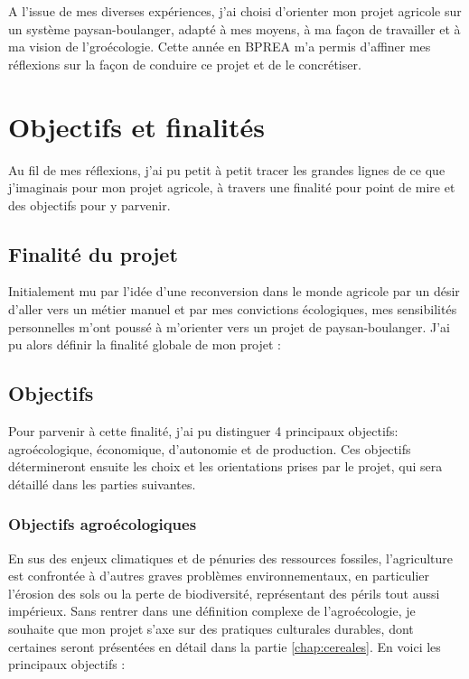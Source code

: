 \documentclass{book}
\begin{document}
A l'issue de mes diverses expériences, j'ai choisi d'orienter mon projet agricole sur un système paysan-boulanger, adapté à mes moyens, à ma façon de travailler et à ma vision de l'groécologie. Cette année en BPREA m'a permis d'affiner mes réflexions sur la façon de conduire ce projet et de le concrétiser. 

\section{Objectifs et finalités}

Au fil de mes réflexions, j'ai pu petit à petit tracer les grandes lignes de ce que j'imaginais pour mon projet agricole, à travers une finalité pour point de mire et des objectifs pour y parvenir.

\subsection{Finalité du projet}

Initialement mu par l'idée d'une reconversion dans le monde agricole par un désir d'aller vers un métier manuel et par mes convictions écologiques, mes sensibilités personnelles m'ont poussé à m'orienter vers un projet de paysan-boulanger. J'ai pu alors définir la finalité globale de mon projet :

\hspace{1cm}

\noindent{}
\hspace{1cm}

\subsection{Objectifs}

Pour parvenir à cette finalité, j'ai pu distinguer 4 principaux objectifs: agroécologique, économique, d'autonomie et de production. Ces objectifs détermineront ensuite les choix et les orientations prises par le projet, qui sera détaillé dans les parties suivantes.

\subsubsection{Objectifs agroécologiques}

En sus des enjeux climatiques et de pénuries des ressources fossiles, l'agriculture est confrontée à d'autres graves problèmes environnementaux, en particulier l'érosion des sols ou la perte de biodiversité, représentant des périls tout aussi impérieux. 
Sans rentrer dans une définition complexe de l'agroécologie, je souhaite que mon projet s'axe sur des pratiques culturales durables, dont certaines seront présentées en détail dans la partie \ref{chap:cereales}. En voici les principaux objectifs :
\end{document}
